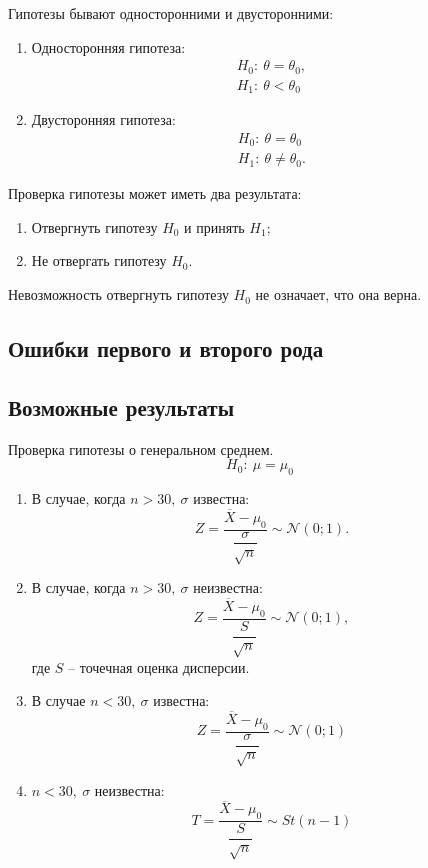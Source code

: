 \par 
Гипотезы бывают односторонними и двусторонними:
\begin{enumerate}
    \item Односторонняя гипотеза:
    \[
        \begin{array}{c}
            H_0 : \ \theta = \theta_0,\\
            H_1 : \ \theta < \theta_0
        \end{array}  
    \]
    \item Двусторонняя гипотеза:
    \[
        \begin{array}{c}
            H_0: \ \theta = \theta_0\\
            H_1: \ \theta \neq \theta_0.
        \end{array}  
    \]
\end{enumerate}

\par 
Проверка гипотезы может иметь два результата:
\begin{enumerate}
    \item Отвергнуть гипотезу $H_0$ и принять $H_1$;
    \item Не отвергать гипотезу $H_0$.
\end{enumerate}

\begin{note}{}{}
    Невозможность отвергнуть гипотезу $H_0$ не означает, что она верна.
\end{note}

\subsection*{Ошибки первого и второго рода}
\subsection*{Возможные результаты}

\par 
\Ex Проверка гипотезы о генеральном среднем. 
\[
    H_0: \ \mu = \mu_0  
\]

\begin{enumerate}
    \item В случае, когда $n > 30, \ \sigma$ известна:
    \[
        Z = \dfrac{\overline{X} - \mu_0}{\dfrac{\sigma}{\sqrt{n}}} \sim \mathcal{N}(0;1).  
    \]
    \item В случае, когда $n > 30, \ \sigma$ неизвестна:
    \[
        Z = \dfrac{\overline{X} - \mu_0}{\dfrac{S}{\sqrt{n}}} \sim \mathcal{N}(0;1),  
    \]
    где $S$ -- точечная оценка дисперсии.
    \item В случае $n < 30, \ \sigma$ известна:
    \[
        Z = \dfrac{\overline{X} - \mu_0}{\dfrac{\sigma}{\sqrt{n}}} \sim \mathcal{N}(0; 1)
    \]
    \item $n < 30, \ \sigma$ неизвестна:
    \[
        T = \dfrac{\overline{X} - \mu_0}{\dfrac{S}{\sqrt{n}}} \sim St(n-1)  
    \]
\end{enumerate}

